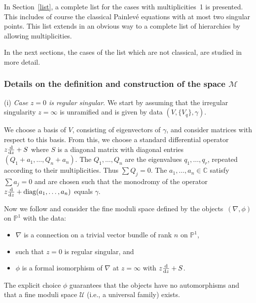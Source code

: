\documentclass[10pt,a4paper]{amsart}
\numberwithin{equation}{section}
\begin{document}
In Section~\ref{list}, a complete list for the cases with multiplicities~1 is presented. This includes of course the classical Painlev\'e equations
with at most two singular points. This list extends in an obvious way to a complete list of hierarchies by allowing multiplicities.


In the next sections, the cases of the list which are not classical, are studied in more detail.

\subsubsection[Details on the definition and construction of the space M]{Details on the definition and construction of the space $\boldsymbol{\mathcal{M}}$}

 (i) \label{(i)} {\it Case $z=0$ is regular singular}. We start by assuming that the irregular singularity $z=\infty$ is unramified and is
given by data $(V, \{V_q\}, \gamma)$.

We choose a basis of $V$, consisting of eigenvectors of $\gamma$, and consider matrices with respect to this basis.
From this, we choose a standard differential operator $z\frac{{\rm d}}{{\rm d}z}+S$ where $S$ is a diagonal matrix with
diagonal entries $( Q_1+a_1,\dots ,Q_n+a_n )$. The $Q_1,\dots ,Q_n$ are the eigenvalues $q_1,\dots ,q_r$, repeated according to their multiplicities. Thus $\sum Q_j=0$. The $a_1,\dots ,a_n \in \mathbb{C}$ satisfy $\sum a_j=0$ and are chosen such that the monodromy of the operator $z\frac{{\rm d}}{{\rm d}z}+\operatorname{diag}(a_1,\dots ,a_n)$ equals $\gamma$.

Now we follow \cite[Section~12]{vdP-Si} and consider the fine moduli space defined by the objects~$(\nabla, \phi)$ on $\mathbb{P}^1$
with the data:
\begin{itemize}\itemsep=0pt
\item[(a)] $\nabla$ is a connection on a trivial vector bundle of rank $n$ on $\mathbb{P}^1$,
\item[(b)] such that $z=0$ is regular singular, and
\item[(c)] $\phi$ is a formal isomorphism of $\nabla$ at $z=\infty$ with $z\frac{{\rm d}}{{\rm d}z}+S$.
\end{itemize}
The explicit choice $\phi$ guarantees that the objects have no automorphisms and that a fine moduli space $\mathcal{U}$
(i.e., a universal family) exists.
\end{document}
